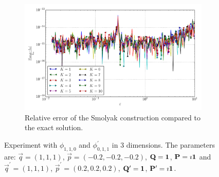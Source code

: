 \documentclass[a4paper,10pt]{article}
\begin{document}
\begin{figure}[ht!]
\begin{subfigure}[t]{0.5\linewidth}
    \includegraphics[width=\linewidth]{./plots/tp_sg_3d_conv_eps_(1,1,0)_(0,1,1)_err_rel_nsd_gk.pdf}
    \caption{Relative error of the Smolyak construction compared to the exact solution.}
    \label{fig:tp_sg_3d_conv_eps_110_011_err_rel_nsd_gk}
  \end{subfigure}
  \label{fig:tp_sg_3d_conv_eps_110_011}
  \caption{Experiment with $\phi_{1,1,0}$ and $\phi_{0,1,1}^{\prime}$
  in 3 dimensions.
  The parameters are:
  $\vec{q} = (1, 1, 1)$,
  $\vec{p} = (-0.2, -0.2, -0.2)$,
  $\mathbf{Q} = \mathbf{1}$,
  $\mathbf{P} = \imath \mathbf{1}$
  and
  $\vec{q}^\prime = (1, 1, 1)$,
  $\vec{p}^\prime = (0.2, 0.2, 0.2)$,
  $\mathbf{Q}^\prime = \mathbf{1}$,
  $\mathbf{P}^\prime = \imath \mathbf{1}$.}
\end{figure}
\end{document}
